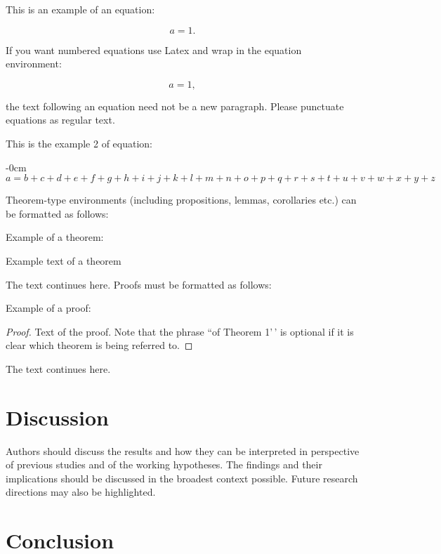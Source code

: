 \documentclass[
]{article}
\begin{document}
This is an example of an equation:

\[
a = 1.
\]

If you want numbered equations use Latex and wrap in the equation environment:

\begin{equation}
a = 1,
\end{equation}

the text following an equation need not be a new paragraph. Please punctuate
equations as regular text.

This is the example 2 of equation:

\begin{adjustwidth}{-\extralength}{0cm}
\begin{equation}
a = b + c + d + e + f + g + h + i + j + k + l + m + n + o + p + q + r + s + t + 
u + v + w + x + y + z
\end{equation}
\end{adjustwidth}

Theorem-type environments (including propositions, lemmas, corollaries etc.)
can be formatted as follows:

Example of a theorem:

\begin{Theorem}
Example text of a theorem

\end{Theorem}

The text continues here. Proofs must be formatted as follows:

Example of a proof:

\begin{proof}
Text of the proof. Note that the phrase ``of Theorem 1'\,' is optional if it is
clear which theorem is being referred to.
\end{proof}

The text continues here.

\hypertarget{discussion}{%
\section{Discussion}\label{discussion}}

Authors should discuss the results and how they can be interpreted in
perspective of previous studies and of the working hypotheses. The findings and
their implications should be discussed in the broadest context possible. Future
research directions may also be highlighted.

\hypertarget{conclusion}{%
\section{Conclusion}\label{conclusion}}
\end{document}
